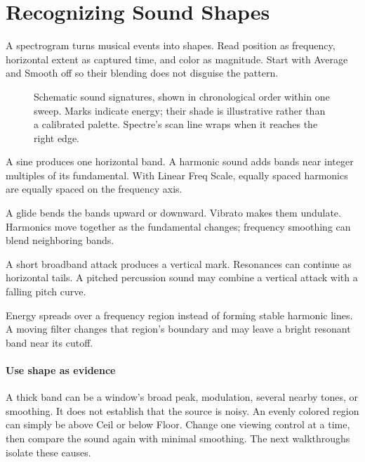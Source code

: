 \section{Recognizing Sound Shapes}\label{sec:shapes}

A spectrogram turns musical events into shapes. Read position as frequency,
horizontal extent as captured time, and color as magnitude. Start with
Average and Smooth off so their blending does not disguise the pattern.

\begin{figure}[!htp]
\centering

\caption{Schematic sound signatures, shown in chronological order within
one sweep. Marks indicate energy; their shade is illustrative rather than a
calibrated palette. Spectre's scan line wraps when it reaches the right edge.}
\end{figure}

\begin{description}[style=nextline,leftmargin=0pt,labelwidth=0pt,labelsep=0pt]
  \item[Steady tone] A sine produces one horizontal band. A harmonic sound
  adds bands near integer multiples of its fundamental. With Linear Freq
  Scale, equally spaced harmonics are equally spaced on the frequency axis.
  \item[Pitch movement] A glide bends the bands upward or downward.
  Vibrato makes them undulate. Harmonics move together as the fundamental
  changes; frequency smoothing can blend neighboring bands.
  \item[Attack and decay] A short broadband attack produces a vertical
  mark. Resonances can continue as horizontal tails. A pitched percussion
  sound may combine a vertical attack with a falling pitch curve.
  \item[Sustained noise] Energy spreads over a frequency region instead
  of forming stable harmonic lines. A moving filter changes that region's
  boundary and may leave a bright resonant band near its cutoff.
\end{description}

\paragraph{Use shape as evidence}
A thick band can be a window's broad peak, modulation, several nearby tones,
or smoothing. It does not establish that the source is noisy. An evenly
colored region can simply be above Ceil or below Floor. Change one viewing
control at a time, then compare the sound again with minimal smoothing.
The next walkthroughs isolate these causes.
